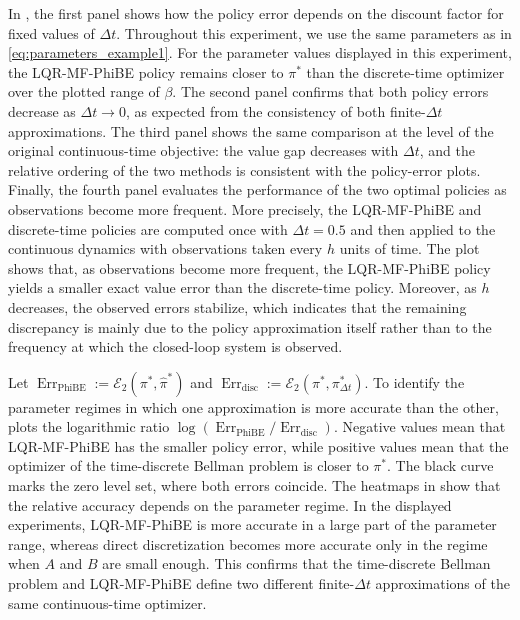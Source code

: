 \documentclass[a4paper, 10pt, english, reqno]{amsart}
\begin{document}
In , the first panel shows how the policy error depends on the discount factor for fixed values of $\Delta t$. Throughout this experiment, we use the same parameters as in \eqref{eq:parameters_example1}. For the parameter values displayed in this experiment, the LQR-MF-PhiBE policy remains closer to $\pi^*$ than the discrete-time optimizer over the plotted range of $\beta$. The second panel confirms that both policy errors decrease as $\Delta t\to0$, as expected from the consistency of both finite-$\Delta t$ approximations. The third panel shows the same comparison at the level of the original continuous-time objective: the value gap decreases with $\Delta t$, and the relative ordering of the two methods is consistent with the policy-error plots. Finally, the fourth panel evaluates the performance of the two optimal policies as observations become more frequent. More precisely, the LQR-MF-PhiBE and discrete-time policies are computed once with $\Delta t=0.5$ and then applied to the continuous dynamics with observations taken every $h$ units of time. The plot shows that, as observations become more frequent, the LQR-MF-PhiBE policy yields a smaller exact value error than the discrete-time policy. Moreover, as $h$ decreases, the observed errors stabilize, which indicates that the remaining discrepancy is mainly due to the policy approximation itself rather than to the frequency at which the closed-loop system is observed.

Let $\operatorname{Err}_{\mathrm{PhiBE}}:=\mathcal{E}_2(\pi^*,\hat\pi^*)
$ and $\operatorname{Err}_{\mathrm{disc}}:=\mathcal{E}_2(\pi^*,\pi_{\Delta t}^*)$. To identify the parameter regimes in which one approximation is more accurate than the other,  plots the logarithmic ratio $\log(\operatorname{Err}_{\mathrm{PhiBE}}/\operatorname{Err}_{\mathrm{disc}})$. Negative values mean that LQR-MF-PhiBE has the smaller policy error, while positive values mean that the optimizer of the time-discrete Bellman problem is closer to $\pi^*$. The black curve marks the zero level set, where both errors coincide. The heatmaps in  show that the relative accuracy depends on the parameter regime. In the displayed experiments, LQR-MF-PhiBE is more accurate in a large part of the parameter range, whereas direct discretization becomes more accurate only in the regime when $A$ and $B$ are small enough. This confirms that the time-discrete Bellman problem and LQR-MF-PhiBE define two different finite-$\Delta t$ approximations of the same continuous-time optimizer.
\end{document}
